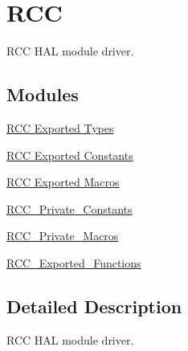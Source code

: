 \hypertarget{group___r_c_c}{\section{R\-C\-C}
\label{group___r_c_c}
}


R\-C\-C H\-A\-L module driver.  


\subsection*{Modules}
\begin{DoxyCompactItemize}
\item 
\hyperlink{group___r_c_c___exported___types}{R\-C\-C Exported Types}
\item 
\hyperlink{group___r_c_c___exported___constants}{R\-C\-C Exported Constants}
\item 
\hyperlink{group___r_c_c___exported___macros}{R\-C\-C Exported Macros}
\item 
\hyperlink{group___r_c_c___private___constants}{R\-C\-C\-\_\-\-Private\-\_\-\-Constants}
\item 
\hyperlink{group___r_c_c___private___macros}{R\-C\-C\-\_\-\-Private\-\_\-\-Macros}
\item 
\hyperlink{group___r_c_c___exported___functions}{R\-C\-C\-\_\-\-Exported\-\_\-\-Functions}
\end{DoxyCompactItemize}


\subsection{Detailed Description}
R\-C\-C H\-A\-L module driver. 